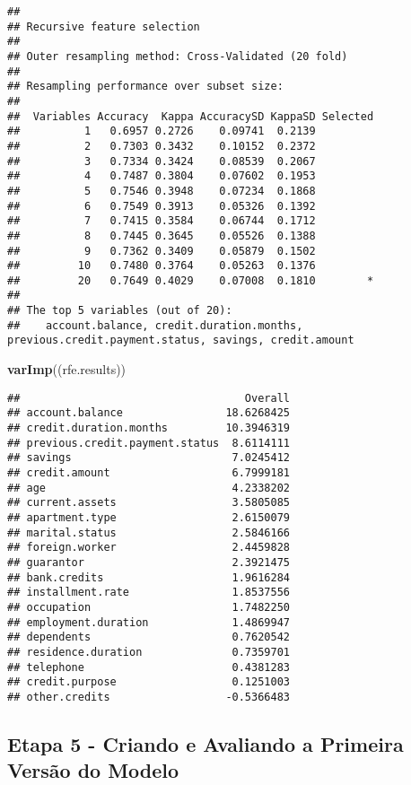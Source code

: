 \documentclass[
]{article}
\newenvironment{Shaded}{\begin{snugshade}}{\end{snugshade}}
\newcommand{\KeywordTok}[1]{\textcolor[rgb]{0.13,0.29,0.53}{\textbf{#1}}}
\newcommand{\NormalTok}[1]{#1}
\begin{document}
\begin{verbatim}
## 
## Recursive feature selection
## 
## Outer resampling method: Cross-Validated (20 fold) 
## 
## Resampling performance over subset size:
## 
##  Variables Accuracy  Kappa AccuracySD KappaSD Selected
##          1   0.6957 0.2726    0.09741  0.2139         
##          2   0.7303 0.3432    0.10152  0.2372         
##          3   0.7334 0.3424    0.08539  0.2067         
##          4   0.7487 0.3804    0.07602  0.1953         
##          5   0.7546 0.3948    0.07234  0.1868         
##          6   0.7549 0.3913    0.05326  0.1392         
##          7   0.7415 0.3584    0.06744  0.1712         
##          8   0.7445 0.3645    0.05526  0.1388         
##          9   0.7362 0.3409    0.05879  0.1502         
##         10   0.7480 0.3764    0.05263  0.1376         
##         20   0.7649 0.4029    0.07008  0.1810        *
## 
## The top 5 variables (out of 20):
##    account.balance, credit.duration.months, previous.credit.payment.status, savings, credit.amount
\end{verbatim}

\begin{Shaded}
\begin{Highlighting}[]
\KeywordTok{varImp}\NormalTok{((rfe.results))}
\end{Highlighting}
\end{Shaded}

\begin{verbatim}
##                                   Overall
## account.balance                18.6268425
## credit.duration.months         10.3946319
## previous.credit.payment.status  8.6114111
## savings                         7.0245412
## credit.amount                   6.7999181
## age                             4.2338202
## current.assets                  3.5805085
## apartment.type                  2.6150079
## marital.status                  2.5846166
## foreign.worker                  2.4459828
## guarantor                       2.3921475
## bank.credits                    1.9616284
## installment.rate                1.8537556
## occupation                      1.7482250
## employment.duration             1.4869947
## dependents                      0.7620542
## residence.duration              0.7359701
## telephone                       0.4381283
## credit.purpose                  0.1251003
## other.credits                  -0.5366483
\end{verbatim}

\hypertarget{etapa-5---criando-e-avaliando-a-primeira-versuxe3o-do-modelo}{%
\subsection{Etapa 5 - Criando e Avaliando a Primeira Versão do
Modelo}\label{etapa-5---criando-e-avaliando-a-primeira-versuxe3o-do-modelo}}
\end{document}
